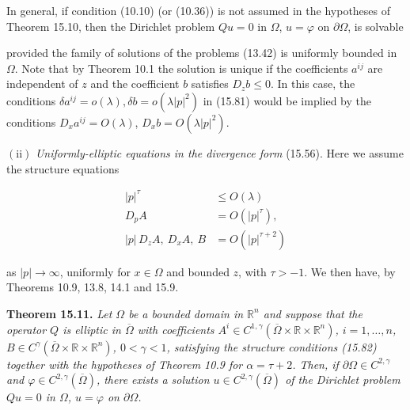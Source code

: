 In general, if condition (10.10) (or (10.36)) is not assumed in the hypotheses of Theorem 15.10, then the Dirichlet problem $Qu = 0$ in $\Omega$, $u = \varphi$ on $\partial\Omega$, is solvable


\providecommand{\R}{\mathbb{R}}
\providecommand{\diver}{\operatorname{div}}

provided the family of solutions of the problems (13.42) is uniformly bounded in
\(\Omega\). Note that by Theorem 10.1 the solution is unique if the coefficients \(a^{ij}\) are
independent of \(z\) and the coefficient \(b\) satisfies \(D_z b \leq 0\). In this case, the conditions
\(\delta a^{ij}=o(\lambda), \delta b=o(\lambda |p|^2)\) in (15.81) would be implied by the conditions \(D_x a^{ij}=O(\lambda)\),
\(D_x b=O(\lambda |p|^2)\).

\medskip

\noindent\((\mathrm{ii})\) \emph{Uniformly-elliptic equations in the divergence form} (15.56). Here we assume
the structure equations

\begin{equation}\tag{15.82}
\begin{aligned}
|p|^\tau &\leq O(\lambda)\\
D_p A &= O(|p|^\tau),\\
|p|\,D_z A,\ D_x A,\ B &= O(|p|^{\tau+2})
\end{aligned}
\end{equation}

as \(|p| \to \infty\), uniformly for \(x \in \Omega\) and bounded \(z\), with \(\tau > -1\). We then have, by
Theorems 10.9, 13.8, 14.1 and 15.9.

\medskip

\noindent\textbf{Theorem 15.11.} \emph{Let \(\Omega\) be a bounded domain in \(\R^n\) and suppose that the operator \(Q\) is
elliptic in \(\overline{\Omega}\) with coefficients \(A^i \in C^{1,\gamma}(\overline{\Omega}\times \R \times \R^n)\), \(i=1,\ldots,n\), \(B \in C^\gamma(\overline{\Omega}\times \R \times \R^n)\),
\(0<\gamma<1\), satisfying the structure conditions (15.82) together with the hypotheses
of Theorem 10.9 for \(\alpha=\tau+2\). Then, if \(\partial\Omega \in C^{2,\gamma}\) and \(\varphi \in C^{2,\gamma}(\overline{\Omega})\), there exists a
solution \(u \in C^{2,\gamma}(\overline{\Omega})\) of the Dirichlet problem \(Qu=0\) in \(\Omega\), \(u=\varphi\) on \(\partial\Omega\).}

\medskip

